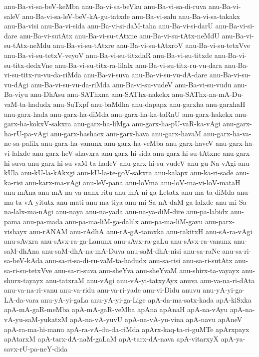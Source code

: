 {anu-Ba-vi-sa-beV-keMba
anu-Ba-vi-sa-beVku
anu-Ba-vi-sa-di-ruva
anu-Ba-vi-saleV
anu-Ba-vi-sa-leV-beV-kA-gu-tatxde
anu-Ba-vi-salu
anu-Ba-vi-sa-takakx
anu-Ba-visi
anu-Ba-vi-sida
anu-Ba-vi-si-daM-taha
anu-Ba-vi-si-darU
anu-Ba-vi-si-dare
anu-Ba-vi-sutAtx
anu-Ba-vi-su-tAtxne
anu-Ba-vi-su-tAtx-neMdU
anu-Ba-vi-su-tAtx-neMdu
anu-Ba-vi-su-tAtxre
anu-Ba-vi-su-tAtxroV
anu-Ba-vi-su-tetxVve
anu-Ba-vi-su-tetxV-veyoV
anu-Ba-vi-su-titxdaR
anu-Ba-vi-su-titxde
anu-Ba-vi-su-titx-dedxVne
anu-Ba-vi-su-titx-ra-lilalx
anu-Ba-vi-su-titx-ru-vu-dara
anu-Ba-vi-su-titx-ru-vu-da-riMda
anu-Ba-vi-suva
anu-Ba-vi-su-vu-dA-dare
anu-Ba-vi-su-vu-dAgi
anu-Ba-vi-su-vu-da-riMda
anu-Ba-vi-su-vudeV
anu-Ba-vi-su-vudu
anu-Ba-viyu
anu-DhAsu
anu-SAThxna
anu-SAThx-nakekx
anu-SAThx-na-mA-Du-vaM-ta-hadudx
anu-SuTxpf
anu-baMdha
anu-dapapx
anu-garxha
anu-garxhaH
anu-garx-hada
anu-garx-ha-diMda
anu-garx-ha-ka-taRnU
anu-garx-hakekx
anu-garx-ha-kokxV-sakxra
anu-garx-ha-liMga
anu-garx-ha-pU-vaR-ka-vAgi
anu-garx-ha-rU-pa-vAgi
anu-garx-hashacx
anu-garx-hava
anu-garx-havaM
anu-garx-ha-va-ne-sa-palilx
anu-garx-ha-vanunx
anu-garx-ha-veMba
anu-garx-haveV
anu-garx-ha-vi-lalxde
anu-garx-heV-shavxra
anu-garx-hi-sida
anu-garx-hi-su-tAtxne
anu-garx-hi-suva
anu-garx-hi-su-vaM-ta-hadeV
anu-garx-hi-su-vudeV
anu-gu-Na-vAgi
anu-kUla
anu-kU-la-kAkxgi
anu-kU-la-te-goV-sakxra
anu-kalapx
anu-ka-ri-sade
anu-ka-risi
anu-karx-ma-vAgi
anu-leV-pana
anu-loVma
anu-loV-ma-vi-loV-mataH
anu-mAna
anu-mA-na-va-nanx-ritu
anu-mA-ni-ga-Letatx
anu-ma-ta-diMda
anu-ma-ta-vA-yitutx
anu-mati
anu-ma-tiya
anu-mi-Sa-nA-daM-ga-lalxde
anu-mi-Sa-na-lalx-ma-nAgi
anu-naya
anu-na-yada
anu-na-ya-diM-dire
anu-pa-labidx
anu-pama
anu-pa-mada
anu-pa-ma-liM-ga-dalilx
anu-pa-ma-liM-gavu
anu-parx-vishayx
anu-rANAM
anu-rAdhA
anu-rA-gA-tamxka
anu-rakitxH
anu-sA-ra-vAgi
anu-sAvxra
anu-sAvx-ra-ga-Lanunx
anu-sAvx-ra-gaLu
anu-sAvx-ra-vanunx
anu-saM-dhAna
anu-saM-dhA-na-mA-Duva
anu-saM-dhA-nisi
anu-sa-raNe
anu-sa-ri-sa-beV-kAda
anu-sa-ri-sa-di-ru-vaM-ta-hadudx
anu-sa-risi
anu-sa-ri-sutAtx
anu-sa-ri-su-tetxVve
anu-sa-ri-suva
anu-sheYva
anu-sheYvaM
anu-shirx-ta-vayayx
anu-shurx-tayayx
anu-tatxraM
anu-vAgi
anu-vA-yi-tatxyAyx
anuva
anu-va-na-ri-dAta
anu-va-na-ri-vanu
anu-va-ridu
anu-va-ri-yade
anu-vi-Didu
anuvu
anu-yA-yi-ga-LA-da-vara
anu-yA-yi-gaLa
anu-yA-yi-ga-Lige
apA-da-ma-satx-kada
apA-kiSxka
apA-mA-gaR-meMba
apA-mA-gaR-veMba
apAna
apAnaH
apA-na-vAyu
apA-na-vA-yu-saM-yukatxM
apA-na-vA-yuvU
apA-na-vA-yu-vina
apA-navu
apAneV
apA-ra-ma-hi-manu
apA-ra-vA-du-da-riMda
apArx-kaq-ta-ri-guMTe
apArxpayx
apAtarxM
apA-tarx-dA-naM-gaLaM
apA-tarx-dA-nava
apA-vitarxyX
apA-ya-savx-rU-pa-neY-dida
}
